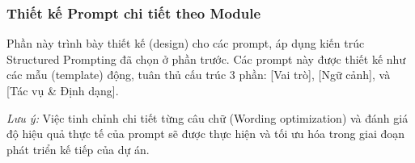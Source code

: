 \subsubsection{Thiết kế Prompt chi tiết theo Module}

Phần này trình bày thiết kế (design) cho các prompt, áp dụng kiến trúc Structured Prompting đã chọn ở phần trước. Các prompt này được thiết kế như các mẫu (template) động, tuân thủ cấu trúc 3 phần: [Vai trò], [Ngữ cảnh], và [Tác vụ \& Định dạng].

\textit{Lưu ý:} Việc tinh chỉnh chi tiết từng câu chữ (Wording optimization) và đánh giá độ hiệu quả thực tế của prompt sẽ được thực hiện và tối ưu hóa trong giai đoạn phát triển kế tiếp của dự án.


